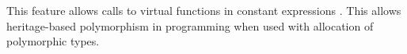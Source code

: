 \documentclass[../main]{subfiles}
\begin{document}
This feature allows calls to virtual functions in constant expressions
\cite{virtual-constexpr}. This allows heritage-based polymorphism in \constexpr
programming when used with \constexpr allocation of polymorphic types.

%
%


%

\end{document}
